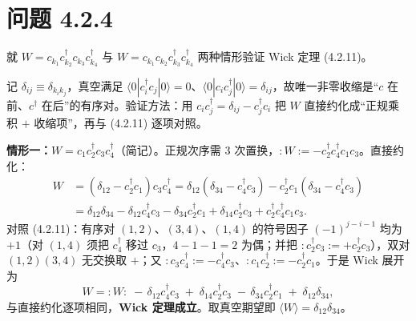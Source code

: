 \section*{问题 4.2.4}
\begin{problem}
就 $W=c_{k_1}c^\dagger_{k_2}c_{k_3}c^\dagger_{k_4}$ 与 $W=c_{k_1}c_{k_2}c^\dagger_{k_3}c^\dagger_{k_4}$ 两种情形验证 Wick 定理 (4.2.11)。
\end{problem}
\solution
记 $\delta_{ij}\equiv\delta_{k_ik_j}$，真空满足 $\langle0|c^\dagger_ic_j|0\rangle=0$、$\langle0|c_ic^\dagger_j|0\rangle=\delta_{ij}$，故唯一非零收缩是“$c$ 在前、$c^\dagger$ 在后”的有序对。验证方法：用 $c_ic^\dagger_j=\delta_{ij}-c^\dagger_jc_i$ 把 $W$ 直接约化成“正规乘积 $+$ 收缩项”，再与 (4.2.11) 逐项对照。

\textbf{情形一：}$W=c_1c^\dagger_2c_3c^\dagger_4$（简记）。正规次序需 3 次置换，$:W:=-c^\dagger_2c^\dagger_4c_1c_3$。直接约化：
\begin{align*}
W&=(\delta_{12}-c^\dagger_2c_1)c_3c^\dagger_4
=\delta_{12}(\delta_{34}-c^\dagger_4c_3)-c^\dagger_2c_1(\delta_{34}-c^\dagger_4c_3)\\
&=\delta_{12}\delta_{34}-\delta_{12}c^\dagger_4c_3-\delta_{34}c^\dagger_2c_1+\delta_{14}c^\dagger_2c_3+c^\dagger_2c^\dagger_4c_1c_3 .
\end{align*}
对照 (4.2.11)：有序对 $(1,2)$、$(3,4)$、$(1,4)$ 的符号因子 $(-1)^{j-i-1}$ 均为 $+1$（对 $(1,4)$ 须把 $c^\dagger_4$ 移过 $c_3$，$4-1-1=2$ 为偶；并把 $:c^\dagger_2c_3:=+c^\dagger_2c_3$），双对 $(1,2)(3,4)$ 无交换取 $+$；又 $:c_3c^\dagger_4:=-c^\dagger_4c_3$、$:c_1c^\dagger_2:=-c^\dagger_2c_1$。于是 Wick 展开为
\begin{equation*}
W=:\!W\!:\;-\,\delta_{12}c^\dagger_4c_3\;+\;\delta_{14}c^\dagger_2c_3\;-\,\delta_{34}c^\dagger_2c_1\;+\;\delta_{12}\delta_{34},
\end{equation*}
与直接约化逐项相同，\textbf{Wick 定理成立}。取真空期望即 $\langle W\rangle=\delta_{12}\delta_{34}$。

